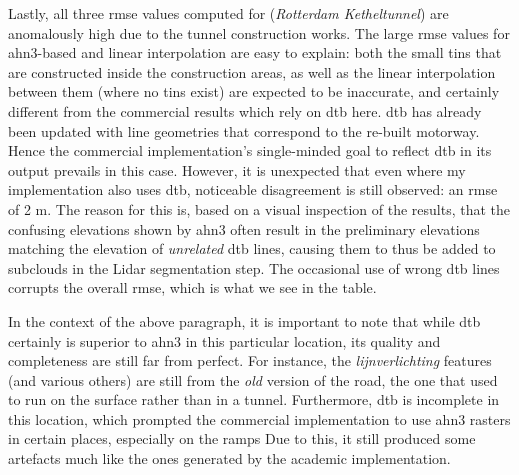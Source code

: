 Lastly, all three \ac{rmse} values computed for  (\textit{Rotterdam Ketheltunnel}) are anomalously high due to the tunnel construction works. The large \ac{rmse} values for \ac{ahn3}-based and linear interpolation are easy to explain: both the small \ac{tin}s that are constructed inside the construction areas, as well as the linear interpolation between them (where no \ac{tin}s exist) are expected to be inaccurate, and certainly different from the commercial results which rely on \ac{dtb} here. \ac{dtb} has already been updated with line geometries that correspond to the re-built motorway. Hence the commercial implementation's single-minded goal to reflect \ac{dtb} in its output prevails in this case. However, it is unexpected that even where my implementation also uses \ac{dtb}, noticeable disagreement is still observed: an \ac{rmse} of 2 m. The reason for this is, based on a visual inspection of the results, that the confusing elevations shown by \ac{ahn3} often result in the preliminary elevations matching the elevation of \textit{unrelated} \ac{dtb} lines, causing them to thus be added to subclouds in the Lidar segmentation step. The occasional use of wrong \ac{dtb} lines corrupts the overall \ac{rmse}, which is what we see in the table.

In the context of the above paragraph, it is important to note that while \ac{dtb} certainly is superior to \ac{ahn3} in this particular location, its quality and completeness are still far from perfect. For instance, the \textit{lijnverlichting} features (and various others) are still from the \textit{old} version of the road, the one that used to run on the surface rather than in a tunnel. Furthermore, \ac{dtb} is incomplete in this location, which prompted the commercial implementation to use \ac{ahn3} rasters in certain places, especially on the ramps Due to this, it still produced some artefacts much like the ones generated by the academic implementation.